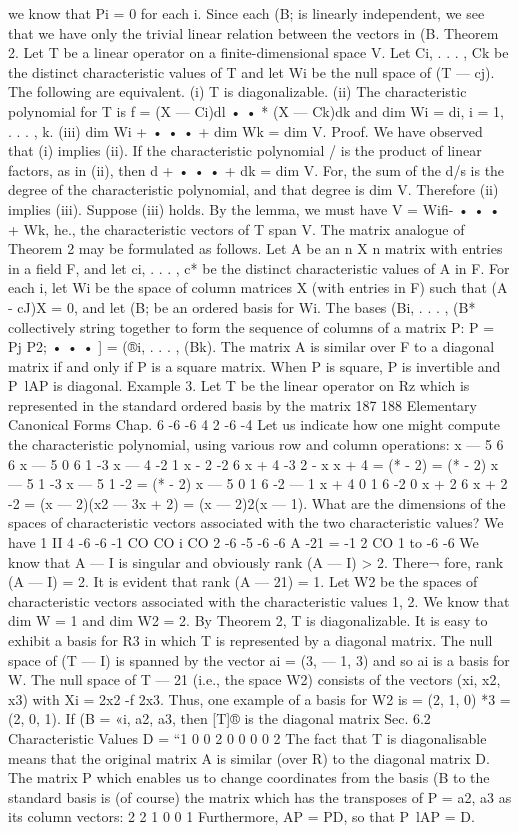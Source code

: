 we know that Pi = 0 for each i. Since each (B; is linearly independent, we see that we have only the trivial linear relation between the vectors in (B. Theorem 2. Let T be a linear operator on a finite-dimensional space V. Let Ci, . . . , Ck be the distinct characteristic values of T and let Wi be the null space of (T — cj). The following are equivalent. (i) T is diagonalizable. (ii) The characteristic polynomial for T is f = (X — Ci)dl • • * (X — Ck)dk and dim Wi = di, i = 1, . . . , k. (iii) dim Wi + • • • + dim Wk = dim V. Proof. We have observed that (i) implies (ii). If the characteristic polynomial / is the product of linear factors, as in (ii), then d + • • • + dk = dim V. For, the sum of the d/s is the degree of the characteristic polynomial, and that degree is dim V. Therefore (ii) implies (iii). Suppose (iii) holds. By the lemma, we must have V = Wifi- • • • + Wk, he., the characteristic vectors of T span V. The matrix analogue of Theorem 2 may be formulated as follows. Let A be an n X n matrix with entries in a field F, and let ci, . . . , c* be the distinct characteristic values of A in F. For each i, let Wi be the space of column matrices X (with entries in F) such that (A - cJ)X = 0, and let (B; be an ordered basis for Wi. The bases (Bi, . . . , (B* collectively string together to form the sequence of columns of a matrix P: P = Pj P2; • • • ] = (®i, . . . , (Bk). The matrix A is similar over F to a diagonal matrix if and only if P is a square matrix. When P is square, P is invertible and P~lAP is diagonal. Example 3. Let T be the linear operator on Rz which is represented in the standard ordered basis by the matrix 187 188 Elementary Canonical Forms Chap. 6 -6 -6 4 2 -6 -4 Let us indicate how one might compute the characteristic polynomial, using various row and column operations: x — 5 6 6 x — 5 0 6 1 -3 x — 4 -2  1 x - 2 -2 6 x + 4 -3 2 - x x + 4 = (* - 2) = (* - 2) x — 5 1 -3 x — 5 1 -2 = (* - 2) x — 5 0 1 6 -2 — 1 x + 4 0 1 6 -2 0 x + 2 6 x + 2 -2 = (x — 2)(x2 — 3x + 2) = (x — 2)2(x — 1). What are the dimensions of the spaces of characteristic vectors associated with the two characteristic values? We have 1 II 4 -6 -6 -1 CO CO i CO 2 -6 -5 -6 -6 A -21 = -1 2 CO 1 to -6 -6 We know that A — I is singular and obviously rank (A — I) > 2. There¬ fore, rank (A — I) = 2. It is evident that rank (A — 21) = 1. Let W2 be the spaces of characteristic vectors associated with the characteristic values 1, 2. We know that dim W = 1 and dim W2 = 2. By Theorem 2, T is diagonalizable. It is easy to exhibit a basis for R3 in which T is represented by a diagonal matrix. The null space of (T — I) is spanned by the vector ai = (3, — 1, 3) and so ai is a basis for W. The null space of T — 21 (i.e., the space W2) consists of the vectors (xi, x2, x3) with Xi = 2x2 -f 2x3. Thus, one example of a basis for W2 is = (2, 1, 0) *3 = (2, 0, 1). If (B = «i, a2, a3, then [T]® is the diagonal matrix Sec. 6.2 Characteristic Values D = “1 0 0 2 0 0 0 0 2 The fact that T is diagonalisable means that the original matrix A is similar (over R) to the diagonal matrix D. The matrix P which enables us to change coordinates from the basis (B to the standard basis is (of course) the matrix which has the transposes of P = a2, a3 as its column vectors: 2 2 1 0 0 1 Furthermore, AP = PD, so that P~lAP = D. 